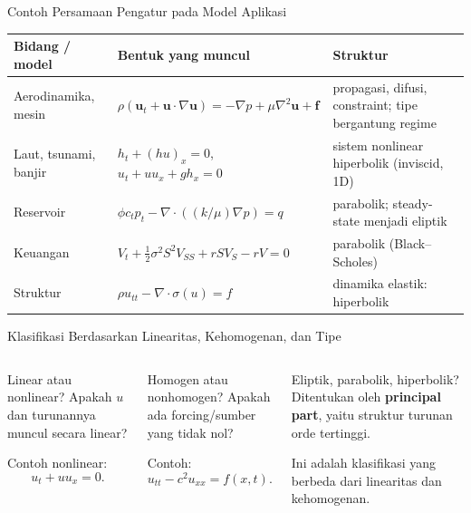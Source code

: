 \documentclass[aspectratio=169,10pt]{beamer}
\begin{document}
\begin{frame}{Contoh Persamaan Pengatur pada Model Aplikasi}
\scriptsize
\renewcommand{\arraystretch}{1.18}
\begin{tabular}{@{}>{\raggedright\arraybackslash}p{2.55cm} >{\raggedright\arraybackslash}p{6.3cm} >{\raggedright\arraybackslash}p{3.4cm}@{}}
\toprule
\textbf{Bidang / model} & \textbf{Bentuk yang muncul} & \textbf{Struktur}\\
\midrule
Aerodinamika, mesin & $\rho(\mathbf u_t+\mathbf u\cdot\nabla\mathbf u)=-\nabla p+\mu\nabla^2\mathbf u+\mathbf f$ & propagasi, difusi, constraint; tipe bergantung regime\\[3pt]
Laut, tsunami, banjir & $h_t+(hu)_x=0$, $u_t+u u_x+g h_x=0$ & sistem nonlinear hiperbolik (inviscid, 1D)\\[3pt]
Reservoir & $\phi c_t p_t-\nabla\cdot((k/\mu)\nabla p)=q$ & parabolik; steady-state menjadi eliptik\\[3pt]
Keuangan & $V_t+\tfrac12\sigma^2S^2V_{SS}+rSV_S-rV=0$ & parabolik (Black--Scholes)\\[3pt]
Struktur & $\rho u_{tt}-\nabla\cdot\sigma(u)=f$ & dinamika elastik: hiperbolik\\
\bottomrule
\end{tabular}
\vspace{0.12cm}
\par{}
\end{frame}

\begin{frame}{Klasifikasi Berdasarkan Linearitas, Kehomogenan, dan Tipe}
\begin{columns}[T,onlytextwidth]
\begin{block}{Linear atau nonlinear?}
Apakah $u$ dan turunannya muncul secara linear?

\vspace{0.12cm}
Contoh nonlinear:
\[
 u_t+u u_x=0.
\]
\end{block}
\begin{block}{Homogen atau nonhomogen?}
Apakah ada forcing/sumber yang tidak nol?

\vspace{0.12cm}
Contoh:
\[
 u_{tt}-c^2u_{xx}=f(x,t).
\]
\end{block}
\begin{block}{Eliptik, parabolik, hiperbolik?}
Ditentukan oleh \textbf{principal part}, yaitu struktur turunan orde tertinggi.

\vspace{0.12cm}
Ini adalah klasifikasi yang berbeda dari linearitas dan kehomogenan.
\end{block}
\end{columns}
\end{frame}
\end{document}

